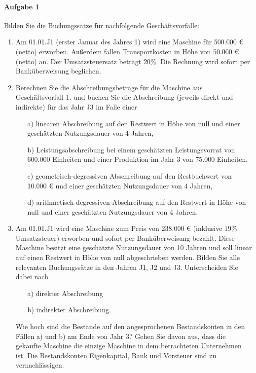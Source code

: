 \documentclass[paper=a4, fontsize=11pt]{scrartcl}
\numberwithin{equation}{section}
\numberwithin{figure}{section}
\numberwithin{table}{section}
\begin{document}
\paragraph{Aufgabe 1}
Bilden Sie die Buchungssätze für nachfolgende Geschäftsvorfälle: \\
\begin{enumerate}
\item Am 01.01.J1 (erster Januar des Jahres 1) wird eine Maschine für 500.000 € (netto) erworben. Außerdem fallen Transportkosten in Höhe von 50.000 € (netto) an. Der Umsatzsteuersatz beträgt $20 \%$. Die Rechnung wird sofort per Banküberweisung beglichen. 
\item Berechnen Sie die Abschreibungsbeträge für die Maschine aus Geschäftsvorfall 1. und buchen Sie die Abschreibung (jeweils direkt und indirekte) für das Jahr J3 im Falle einer  
\begin{itemize}
\item[a)] linearen Abschreibung auf den Restwert in Höhe von null und einer geschätzten Nutzungsdauer von 4 Jahren,  
\item[b)] Leistungsabschreibung bei einem geschätzten Leistungsvorrat von 600.000 Einheiten und einer Produktion im Jahr 3 von 75.000 Einheiten,  
\item[c)] geometrisch-degressiven Abschreibung auf den Restbuchwert von 10.000 € und einer geschätzten Nutzungsdauer von 4 Jahren,  
\item[d)] arithmetisch-degressiven Abschreibung auf den Restwert in Höhe von null und einer geschätzten Nutzungsdauer von 4 Jahren. 
\end{itemize}
\item Am 01.01.J1 wird eine Maschine zum Preis von 238.000 € (inklusive $19 \%$ Umsatzsteuer) erworben und sofort per Banküberweisung bezahlt. Diese Maschine besitzt eine geschätzte Nutzungsdauer von 10 Jahren und soll linear auf einen Restwert in Höhe von null abgeschrieben werden. Bilden Sie alle relevanten Buchungssätze in den Jahren J1, J2 und J3. Unterscheiden Sie dabei nach 
\begin{itemize}
\item[a)] direkter Abschreibung 
\item[b)] indirekter Abschreibung. 
\end{itemize} 
Wie hoch sind die Bestände auf den angesprochenen Bestandskonten in den Fällen a) und b) am Ende von Jahr 3? Gehen Sie davon aus, dass die gekaufte Maschine die einzige Maschine in dem betrachteten Unternehmen ist. Die Bestandskonten Eigenkapital, Bank und Vorsteuer sind zu vernachlässigen. 

\end{enumerate}
\end{document}
